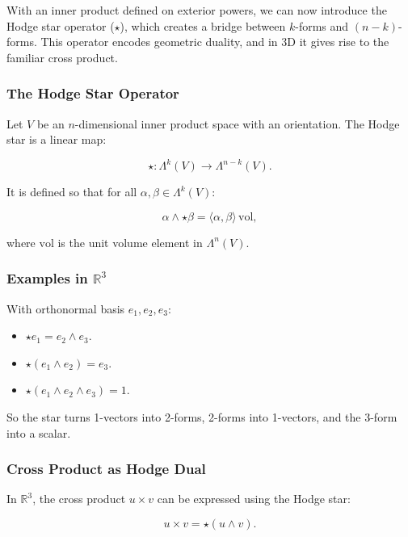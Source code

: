 \documentclass[
  letterpaper,
  DIV=11,
  numbers=noendperiod]{scrreprt}
\providecommand{\tightlist}{%
  \setlength{\itemsep}{0pt}\setlength{\parskip}{0pt}}
\begin{document}
With an inner product defined on exterior powers, we can now introduce
the Hodge star operator (\(\star\)), which creates a bridge between
\(k\)-forms and \((n-k)\)-forms. This operator encodes geometric
duality, and in 3D it gives rise to the familiar cross product.

\subsubsection{The Hodge Star Operator}\label{the-hodge-star-operator}

Let \(V\) be an \(n\)-dimensional inner product space with an
orientation. The Hodge star is a linear map:

\[
\star : \Lambda^k(V) \to \Lambda^{n-k}(V).
\]

It is defined so that for all \(\alpha, \beta \in \Lambda^k(V)\):

\[
\alpha \wedge \star \beta = \langle \alpha, \beta \rangle \, \mathrm{vol},
\]

where \(\mathrm{vol}\) is the unit volume element in \(\Lambda^n(V)\).

\subsubsection{\texorpdfstring{Examples in
\(\mathbb{R}^3\)}{Examples in \textbackslash mathbb\{R\}\^{}3}}\label{examples-in-mathbbr3}

With orthonormal basis \(e_1, e_2, e_3\):

\begin{itemize}
\tightlist
\item
  \(\star e_1 = e_2 \wedge e_3\).
\item
  \(\star (e_1 \wedge e_2) = e_3\).
\item
  \(\star (e_1 \wedge e_2 \wedge e_3) = 1\).
\end{itemize}

So the star turns 1-vectors into 2-forms, 2-forms into 1-vectors, and
the 3-form into a scalar.

\subsubsection{Cross Product as Hodge
Dual}\label{cross-product-as-hodge-dual}

In \(\mathbb{R}^3\), the cross product \(u \times v\) can be expressed
using the Hodge star:

\[
u \times v = \star (u \wedge v).
\]
\end{document}
